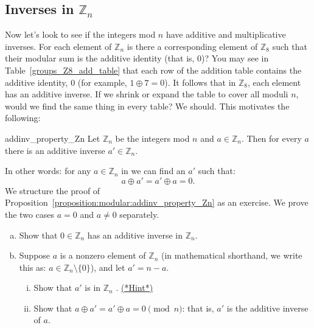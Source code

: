 \subsection{Inverses in ${\mathbb Z}_n$}

Now let's look to see if the integers mod $n$ have additive and multiplicative inverses.  For each element of  ${\mathbb Z}_n$ is there a corresponding element of ${\mathbb Z}_8$ such that their modular sum is the additive identity (that is, 0)?  You may see in Table~\ref{groups_Z8_add_table} that each row of the addition table contains the additive identity, $0$ (for example, $1\oplus 7 = 0$).  It follows that in ${\mathbb Z}_8$, each element has an additive inverse.  If we shrink or expand the table to cover all moduli $n$, would we find the same thing in every table?  We should. This motivates the following:

\begin{prop}{addinv_property_Zn}
Let ${\mathbb Z}_n$ be the  integers mod $n$ and $a \in {\mathbb Z}_n$. Then for every  $a$  there is an additive inverse $a' \in {\mathbb Z}_n$.  

In other words: for any $a \in {\mathbb Z}_n$ in  we can find an $a'$ such that:
\[
a \oplus a' = a' \oplus a  = 0.
\]
We structure the proof of Proposition~\ref{proposition:modular:addinv_property_Zn} as an exercise. We prove the two cases $a=0$ and $a \neq 0$ separately.

\begin{exercise}{58}

\begin{enumerate}[(a)]
\item
Show that  $0 \in {\mathbb Z}_n$ has an additive inverse in ${\mathbb Z}_n$.

\item
Suppose $a$ is a nonzero element of ${\mathbb Z}_n$  (in mathematical shorthand, we write this as: $a \in {\mathbb Z}_n \setminus \{0\}$), and let $a' = n-a$.
\begin{enumerate}[(i)]
\item
Show that $a'$ is in ${\mathbb Z}_n$ .
\hyperref[sec:modular_arithmetic:hints]{(*Hint*)}
\item
Show that $a \oplus a' = a' \oplus a  = 0 \pmod{ n}$: that is, $a'$ is the additive inverse of $a$.
\end{enumerate}
\end{enumerate}
\end{exercise}
\end{prop}

